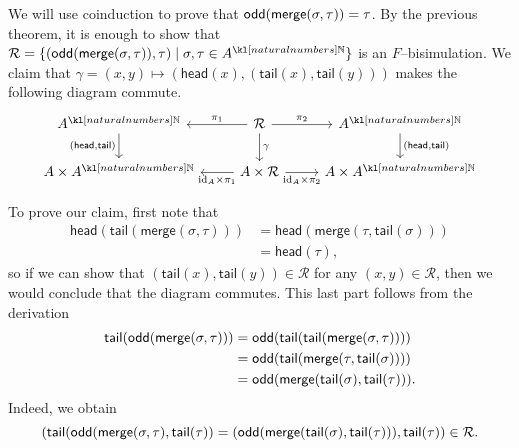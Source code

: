 \documentclass[main.tex]{subfiles}
\begin{document}
\begin{exmp}
	We will use coinduction to prove that $\textsf{odd}(\textsf{merge}(\sigma, \tau)) = \tau$. By the previous theorem, it is enough to show that $\mathcal{R} = \{(\textsf{odd}(\textsf{merge}(\sigma, \tau)), \tau) \mid \sigma, \tau \in A^{\N}\}$ is an $F$--bisimulation. We claim that $\gamma = (x,y) \mapsto (\textsf{head}(x), (\textsf{tail}(x), \textsf{tail}(y)))$ makes the following diagram commute. 
	\begin{equation}\label{diag-mergebisim}
		\centering
		\begin{tikzcd}
			A^{\N} \arrow[d, "{( \textsf{head}, \textsf{tail})}"'] & \mathcal{R} \arrow[l, "\pi_1"'] \arrow[r, "\pi_2"] \arrow[d, "\gamma"] & A^{\N} \arrow[d, "{(\textsf{head}, \textsf{tail})}"] \\
			A\times A^{\N} & A\times \mathcal{R} \arrow[l, "\text{id}_A\times \pi_1"] \arrow[r, "\text{id}_A\times \pi_2"'] & A\times A^{\N}
		\end{tikzcd}
	\end{equation}
	
	To prove our claim, first note that
	\begin{align*}
		 \textsf{head}(\textsf{tail}(\textsf{merge}(\sigma, \tau))) &= \textsf{head}(\textsf{merge}(\tau, \textsf{tail}(\sigma)))\\ &= \textsf{head}(\tau),
	\end{align*}
	so if we can show that $(\textsf{tail}(x), \textsf{tail}(y)) \in \mathcal{R}$ for any $(x,y) \in \mathcal{R}$, then we would conclude that the diagram commutes. This last part follows from the derivation
	\begin{align*}
		\textsf{tail}(\textsf{odd}(\textsf{merge}(\sigma, \tau))) &=
		\textsf{odd}(\textsf{tail}(\textsf{tail}(\textsf{merge}(\sigma,\tau))))\\
		&= \textsf{odd}(\textsf{tail}(\textsf{merge}(\tau, \textsf{tail}(\sigma))))\\
		&= \textsf{odd}(\textsf{merge}(\textsf{tail}(\sigma),\textsf{tail}(\tau))).
    \end{align*}
    Indeed, we obtain 
    \[(\textsf{tail}(\textsf{odd}(\textsf{merge}(\sigma, \tau), \textsf{tail}(\tau)) =(\textsf{odd}(\textsf{merge}(\textsf{tail}(\sigma),\textsf{tail}(\tau))), \textsf{tail}(\tau)) \in \mathcal{R}.\]
\end{exmp}
\end{document}
